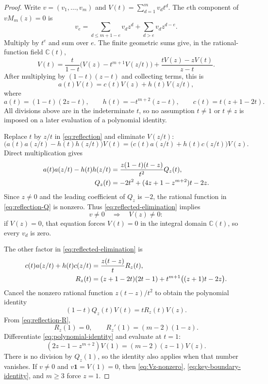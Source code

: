 \documentclass[11pt]{article}
\theoremstyle{remark}
\newcommand{\one}{\boldsymbol 1}
\begin{document}
\begin{proof}
Write $v=(v_1,\ldots,v_m)$ and $V(t)=\sum_{d=1}^m v_dt^d$.
The $e$th component of $vM_m(z)=0$ is
\begin{equation}\label{eq:left-null-components}
 v_e=\sum_{d\leq m+1-e}v_dz^d
       +\sum_{d>e}v_dz^{d-e}.
\end{equation}
Multiply by $t^e$ and sum over $e$.  The finite geometric sums give, in
the rational-function field $\mathbb C(t)$,
\[
 V(t)=\frac{t}{1-t}\bigl(V(z)-t^{m+1}V(z/t)\bigr)
       +\frac{tV(z)-zV(t)}{z-t}.
\]
After multiplying by $(1-t)(z-t)$ and collecting terms, this is
\begin{equation}\label{eq:reflection}
 a(t)V(t)=c(t)V(z)+h(t)V(z/t),
\end{equation}
where
\[
 a(t)=(1-t)(2z-t),\qquad
 h(t)=-t^{m+2}(z-t),\qquad
 c(t)=t(z+1-2t).
\]
All divisions above are in the indeterminate $t$, so no assumption
$t\neq1$ or $t\neq z$ is imposed on a later evaluation of a polynomial
identity.

Replace $t$ by $z/t$ in \eqref{eq:reflection} and eliminate $V(z/t)$:
\begin{equation}\label{eq:reflected-elimination}
 \bigl(a(t)a(z/t)-h(t)h(z/t)\bigr)V(t)
 =\bigl(c(t)a(z/t)+h(t)c(z/t)\bigr)V(z).
\end{equation}
Direct multiplication gives
\begin{align}
 a(t)a(z/t)-h(t)h(z/t)
 &=\frac{z(1-t)(t-z)}{t^2}Q_z(t),\label{eq:reflection-Q}\\
 Q_z(t)&=-2t^2+(4z+1-z^{m+2})t-2z.\notag
\end{align}
Since $z\neq0$ and the leading coefficient of $Q_z$ is $-2$, the rational
function in \eqref{eq:reflection-Q} is nonzero.  Thus
\eqref{eq:reflected-elimination} implies
\begin{equation}\label{eq:Vz-nonzero}
 v\neq0\quad\Longrightarrow\quad V(z)\neq0:
\end{equation}
if $V(z)=0$, that equation forces $V(t)=0$ in the integral domain
$\mathbb C(t)$, so every $v_d$ is zero.

The other factor in \eqref{eq:reflected-elimination} is
\begin{align}
 c(t)a(z/t)+h(t)c(z/t)&=\frac{z(t-z)}t R_z(t),\notag\\
 R_z(t)&=(z+1-2t)(2t-1)
          +t^{m+1}\bigl((z+1)t-2z\bigr).\label{eq:reflection-R}
\end{align}
Cancel the nonzero rational function $z(t-z)/t^2$ to obtain the polynomial
identity
\begin{equation}\label{eq:polynomial-identity}
 (1-t)Q_z(t)V(t)=tR_z(t)V(z).
\end{equation}
From \eqref{eq:reflection-R},
\[
 R_z(1)=0,\qquad R_z'(1)=(m-2)(1-z).
\]
Differentiate \eqref{eq:polynomial-identity} and evaluate at $t=1$:
\begin{equation}\label{eq:key-boundary-identity}
 (2z-1-z^{m+2})V(1)=(m-2)(z-1)V(z).
\end{equation}
There is no division by $Q_z(1)$, so the identity also applies when that
number vanishes.  If $v\neq0$ and $v\one=V(1)=0$, then
\eqref{eq:Vz-nonzero}, \eqref{eq:key-boundary-identity}, and $m\geq3$ force
$z=1$.


\end{proof}
\end{document}
